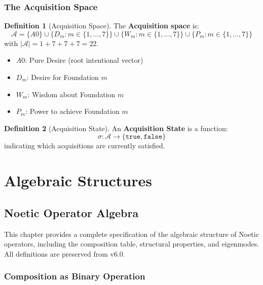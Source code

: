 \documentclass[11pt,twoside,openright]{book}
\theoremstyle{definition}
\newtheorem{definition}{Definition}[chapter]
\theoremstyle{plain}
\theoremstyle{remark}
\newcommand{\Acquisitions}{\mathcal{A}}
\newcommand{\AcqState}{\sigma}
\begin{document}
\section{The Acquisition Space}

\begin{definition}[Acquisition Space]
\label{def:acq-space}
The \textbf{Acquisition space} is:
\[
\Acquisitions = \{A0\} \cup \{D_m : m \in \{1,\ldots,7\}\} \cup \{W_m : m \in \{1,\ldots,7\}\} \cup \{P_m : m \in \{1,\ldots,7\}\}
\]
with $|\Acquisitions| = 1 + 7 + 7 + 7 = 22$.

\begin{itemize}
  \item $A0$: Pure Desire (root intentional vector)
  \item $D_m$: Desire for Foundation $m$
  \item $W_m$: Wisdom about Foundation $m$
  \item $P_m$: Power to achieve Foundation $m$
\end{itemize}
\end{definition}

\begin{definition}[Acquisition State]
\label{def:acq-state}
An \textbf{Acquisition State} is a function:
\[
\AcqState : \Acquisitions \to \{\mathtt{true}, \mathtt{false}\}
\]
indicating which acquisitions are currently satisfied.
\end{definition}

\part{Algebraic Structures}

\chapter{Noetic Operator Algebra}
\label{ch:noetic-algebra}

This chapter provides a complete specification of the algebraic structure of Noetic operators, including the composition table, structural properties, and eigenmodes. All definitions are preserved from v6.0.

\section{Composition as Binary Operation}
\end{document}
